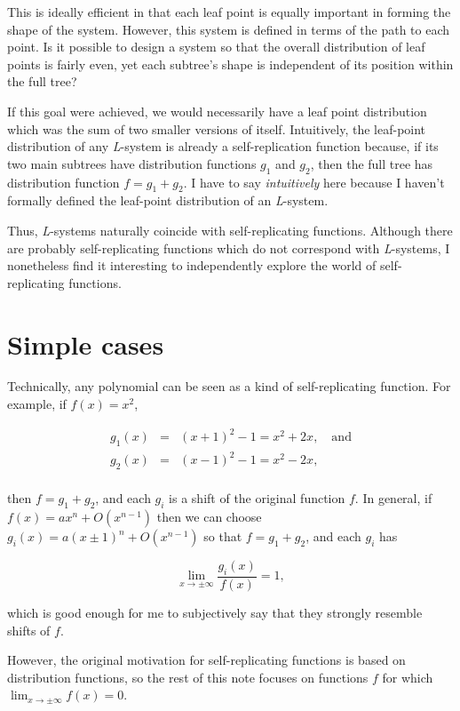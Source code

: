 \documentclass[]{article}
\begin{document}
This is ideally efficient in that each leaf point is equally important
in forming the shape of the system. However, this system is defined in
terms of the path to each point. Is it possible to design a system so
that the overall distribution of leaf points is fairly even, yet each
subtree's shape is independent of its position within the full tree?

If this goal were achieved, we would necessarily have a leaf point
distribution which was the sum of two smaller versions of itself.
Intuitively, the leaf-point distribution of any \emph{L}-system is
already a self-replication function because, if its two main subtrees
have distribution functions \(g_1\) and \(g_2\), then the full tree has
distribution function \(f = g_1 + g_2\). I have to say
\emph{intuitively} here because I haven't formally defined the
leaf-point distribution of an \emph{L}-system.

Thus, \emph{L}-systems naturally coincide with self-replicating
functions. Although there are probably self-replicating functions which
do not correspond with \emph{L}-systems, I nonetheless find it
interesting to independently explore the world of self-replicating
functions.

\section{Simple cases}\label{simple-cases}

Technically, any polynomial can be seen as a kind of self-replicating
function. For example, if \(f(x) = x^2\),

\[\begin{array}{rcl}
  g_1(x) & = & (x + 1)^2 - 1 = x^2 + 2x, \quad \text{and} \\
  g_2(x) & = & (x - 1)^2 - 1 = x^2 - 2x, \\
\end{array}\]

then \(f = g_1 + g_2\), and each \(g_i\) is a shift of the original
function \(f\). In general, if \(f(x) = ax^n + O(x^{n-1})\) then we can
choose \(g_i(x) = a(x\pm 1)^n + O(x^{n-1})\) so that \(f = g_1 + g_2\),
and each \(g_i\) has

\[ \lim_{x\to\pm\infty}\frac{g_i(x)}{f(x)} = 1,\]

which is good enough for me to subjectively say that they strongly
resemble shifts of \(f\).

However, the original motivation for self-replicating functions is based
on distribution functions, so the rest of this note focuses on functions
\(f\) for which \(\lim_{x\to\pm\infty}f(x) = 0\).
\end{document}
